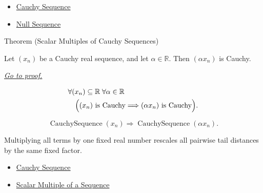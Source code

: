 \begin{dependencies}
\begin{itemize}
  \item \hyperref[def:cauchy-sequence]{Cauchy Sequence}
  \item \hyperref[def:null-sequence]{Null Sequence}
\end{itemize}
\end{dependencies}


\begin{theorembox}{Theorem (Scalar Multiples of Cauchy Sequences)}
\begin{theorem}
\label{thm:scalar-multiple-cauchy-sequence}
Let $(x_n)$ be a Cauchy real sequence, and let $\alpha\in\mathbb{R}$.
Then $(\alpha x_n)$ is Cauchy.

\smallskip
\noindent
\hyperref[prf:scalar-multiple-cauchy-sequence]{\textit{Go to proof.}}
\end{theorem}
\end{theorembox}

\begin{remark*}
\[
\begin{aligned}
&\forall (x_n)\subseteq\mathbb{R}\;\forall \alpha\in\mathbb{R}\\
&\quad
\Bigl(
  (x_n)\text{ is Cauchy}
  \Longrightarrow
  (\alpha x_n)\text{ is Cauchy}
\Bigr).
\end{aligned}
\]
\end{remark*}

\begin{remark*}
\[
\operatorname{CauchySequence}(x_n)
\Longrightarrow
\operatorname{CauchySequence}(\alpha x_n).
\]
\end{remark*}

\begin{remark*}[Interpretation]
Multiplying all terms by one fixed real number rescales all pairwise tail
distances by the same fixed factor.
\end{remark*}

\begin{dependencies}
\begin{itemize}
  \item \hyperref[def:cauchy-sequence]{Cauchy Sequence}
  \item \hyperref[def:scalar-multiple-sequence]{Scalar Multiple of a Sequence}
\end{itemize}
\end{dependencies}

